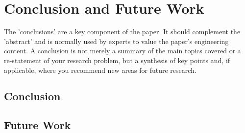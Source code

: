 \chapter{Conclusion and Future Work}
The 'conclusions' are a key component of the paper. It should complement the 'abstract' and is normally used by experts to value the paper's engineering content. A conclusion is not merely a summary of the main topics covered or a re-statement of your research problem, but a synthesis of key points and, if applicable, where you recommend new areas for future research.
\section{Conclusion}
\section{Future Work}

